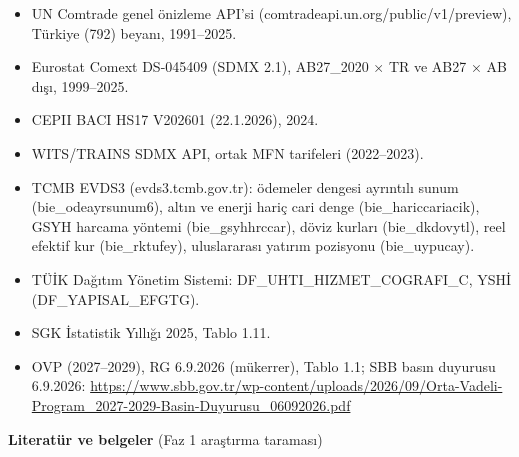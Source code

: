 \begin{itemize}
\tightlist
\item
  UN Comtrade genel önizleme API'si (comtradeapi.un.org/public/v1/preview), Türkiye (792) beyanı, 1991--2025.
\item
  Eurostat Comext DS-045409 (SDMX 2.1), AB27\_2020 × TR ve AB27 × AB dışı, 1999--2025.
\item
  CEPII BACI HS17 V202601 (22.1.2026), 2024.
\item
  WITS/TRAINS SDMX API, ortak MFN tarifeleri (2022--2023).
\item
  TCMB EVDS3 (evds3.tcmb.gov.tr): ödemeler dengesi ayrıntılı sunum (bie\_odeayrsunum6), altın ve enerji hariç cari denge (bie\_hariccariacik), GSYH harcama yöntemi (bie\_gsyhhrccar), döviz kurları (bie\_dkdovytl), reel efektif kur (bie\_rktufey), uluslararası yatırım pozisyonu (bie\_uypucay).
\item
  TÜİK Dağıtım Yönetim Sistemi: DF\_UHTI\_HIZMET\_COGRAFI\_C, YSHİ (DF\_YAPISAL\_EFGTG).
\item
  SGK İstatistik Yıllığı 2025, Tablo 1.11.
\item
  OVP (2027--2029), RG 6.9.2026 (mükerrer), Tablo 1.1; SBB basın duyurusu 6.9.2026: \url{https://www.sbb.gov.tr/wp-content/uploads/2026/09/Orta-Vadeli-Program_2027-2029-Basin-Duyurusu_06092026.pdf}
\end{itemize}

\textbf{Literatür ve belgeler} (Faz 1 araştırma taraması)

